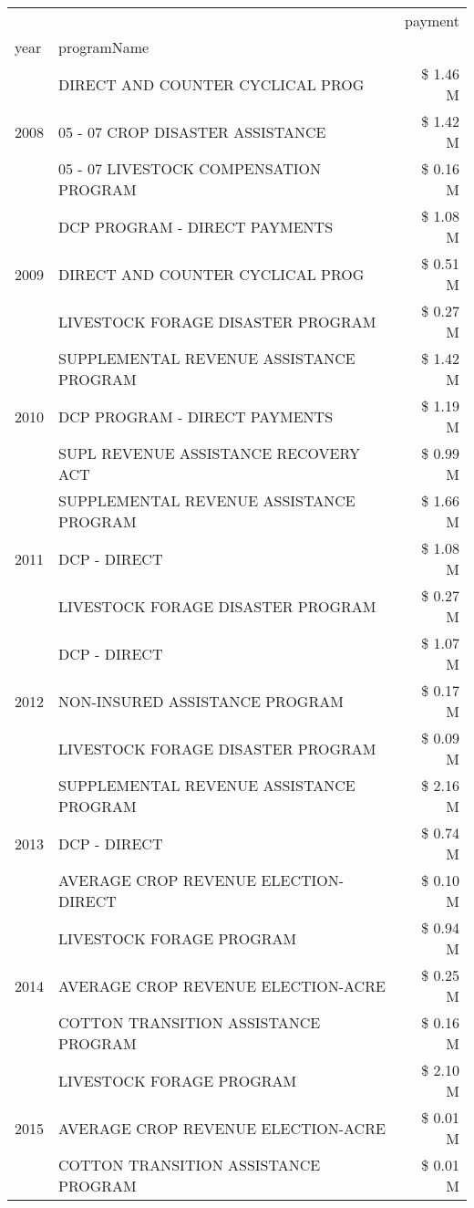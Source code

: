 \begin{tabular}{llr}
\toprule
 &  & payment \\
year & programName &  \\
\midrule
\multirow[t]{3}{*}{2008} & DIRECT AND COUNTER CYCLICAL PROG & \$ 1.46 M \\
 & 05 - 07 CROP DISASTER ASSISTANCE & \$ 1.42 M \\
 & 05 - 07 LIVESTOCK COMPENSATION PROGRAM & \$ 0.16 M \\
\cline{1-3}
\multirow[t]{3}{*}{2009} & DCP PROGRAM - DIRECT PAYMENTS & \$ 1.08 M \\
 & DIRECT AND COUNTER CYCLICAL PROG & \$ 0.51 M \\
 & LIVESTOCK FORAGE DISASTER  PROGRAM & \$ 0.27 M \\
\cline{1-3}
\multirow[t]{3}{*}{2010} & SUPPLEMENTAL REVENUE ASSISTANCE PROGRAM & \$ 1.42 M \\
 & DCP PROGRAM - DIRECT PAYMENTS & \$ 1.19 M \\
 & SUPL REVENUE ASSISTANCE RECOVERY ACT & \$ 0.99 M \\
\cline{1-3}
\multirow[t]{3}{*}{2011} & SUPPLEMENTAL REVENUE ASSISTANCE PROGRAM & \$ 1.66 M \\
 & DCP - DIRECT & \$ 1.08 M \\
 & LIVESTOCK FORAGE DISASTER PROGRAM & \$ 0.27 M \\
\cline{1-3}
\multirow[t]{3}{*}{2012} & DCP - DIRECT & \$ 1.07 M \\
 & NON-INSURED ASSISTANCE PROGRAM & \$ 0.17 M \\
 & LIVESTOCK FORAGE DISASTER PROGRAM & \$ 0.09 M \\
\cline{1-3}
\multirow[t]{3}{*}{2013} & SUPPLEMENTAL REVENUE ASSISTANCE PROGRAM & \$ 2.16 M \\
 & DCP - DIRECT & \$ 0.74 M \\
 & AVERAGE CROP REVENUE ELECTION-DIRECT & \$ 0.10 M \\
\cline{1-3}
\multirow[t]{3}{*}{2014} & LIVESTOCK FORAGE PROGRAM & \$ 0.94 M \\
 & AVERAGE CROP REVENUE ELECTION-ACRE & \$ 0.25 M \\
 & COTTON TRANSITION ASSISTANCE PROGRAM & \$ 0.16 M \\
\cline{1-3}
\multirow[t]{3}{*}{2015} & LIVESTOCK FORAGE PROGRAM & \$ 2.10 M \\
 & AVERAGE CROP REVENUE ELECTION-ACRE & \$ 0.01 M \\
 & COTTON TRANSITION ASSISTANCE PROGRAM & \$ 0.01 M \\

\end{tabular}
